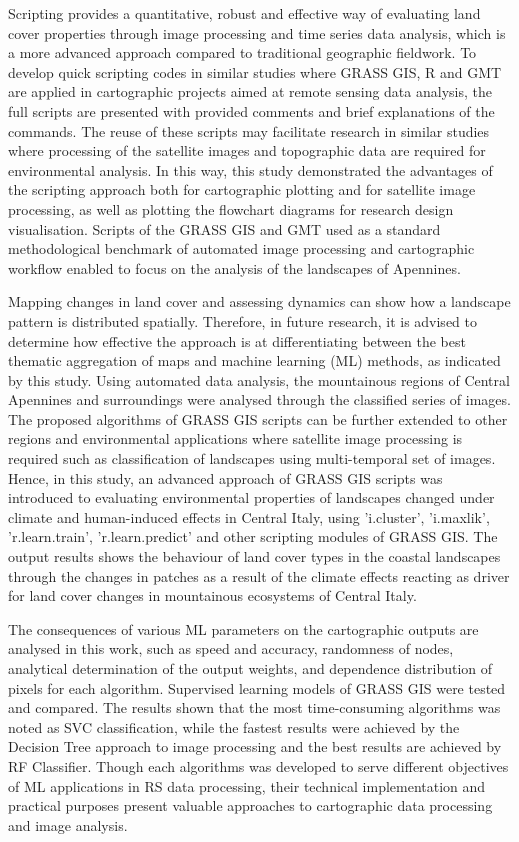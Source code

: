 \documentclass[remotesensing,article,submit,pdftex,moreauthors]{Definitions/mdpi}
\begin{document}
Scripting provides a quantitative, robust and effective way of evaluating land cover properties through image processing and time series data analysis, which is a more advanced approach compared to traditional geographic fieldwork. To develop quick scripting codes in similar studies where GRASS GIS, R and GMT are applied in cartographic projects aimed at remote sensing data analysis, the full scripts are presented with provided comments and brief explanations of the commands. The reuse of these scripts may facilitate research in similar studies where processing of the satellite images and topographic data are required for environmental analysis. In this way, this study demonstrated the advantages of the scripting approach both for cartographic plotting and for satellite image processing, as well as plotting the flowchart diagrams for research design visualisation. Scripts of the GRASS GIS and GMT used as a standard methodological benchmark of automated image processing and cartographic workflow enabled to focus on the analysis of the landscapes of Apennines. 

Mapping changes in land cover and assessing dynamics can show how a landscape pattern is distributed spatially. Therefore, in future  research, it is advised to determine how effective the approach is at differentiating between the best thematic aggregation of maps and machine learning (ML) methods, as indicated by this study. Using automated data analysis, the mountainous regions of Central Apennines and surroundings were analysed through the classified series of images. The proposed algorithms of GRASS GIS scripts can be further extended to other regions and environmental applications where satellite image processing is required such as classification of landscapes using multi-temporal set of images. Hence, in this study, an advanced approach of GRASS GIS scripts was  introduced to evaluating environmental properties of landscapes changed under climate and human-induced effects in Central Italy, using 'i.cluster', 'i.maxlik', 'r.learn.train', 'r.learn.predict' and other scripting modules of GRASS GIS. The output results shows the behaviour of land cover types in the coastal landscapes through the changes in patches as a result of the climate effects reacting as driver for land cover changes in mountainous ecosystems of Central Italy. 

The consequences of various ML parameters on the cartographic outputs are analysed in this work, such as speed and accuracy, randomness of nodes, analytical determination of the output weights, and dependence distribution of pixels for each algorithm. Supervised learning models of GRASS GIS were tested and compared. The results shown that the most time-consuming algorithms was noted as SVC classification, while the fastest results were achieved by the Decision Tree approach to image processing and the best results are achieved by RF Classifier. Though each algorithms was developed to serve different objectives of ML applications in RS data processing, their technical implementation and practical purposes present valuable approaches to cartographic data processing and image analysis. 
\end{document}
